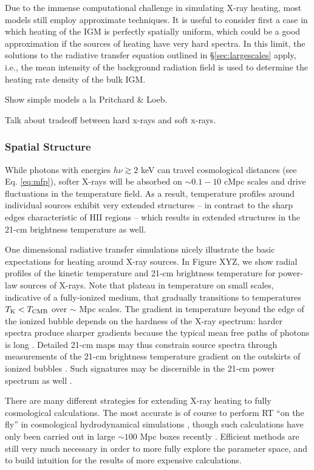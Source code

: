 Due to the immense computational challenge in simulating X-ray heating, most models still employ approximate techniques. It is useful to consider first a case in which heating of the IGM is perfectly spatially uniform, which could be a good approximation if the sources of heating have very hard spectra. In this limit, the solutions to the radiative transfer equation outlined in \S\ref{sec:largescales} apply, i.e., the mean intensity of the background radiation field is used to determine the heating rate density of the bulk IGM. 

{\color{red} Show simple models a la Pritchard \& Loeb.}

Talk about tradeoff between hard x-rays and soft x-rays.


\subsubsection{Spatial Structure} \label{sec:temperature_local}
While photons with energies $h\nu \gtrsim 2$ keV can travel cosmological distances (see Eq. \ref{eq:mfp}), softer X-rays will be absorbed on $\sim 0.1-10$ cMpc scales and drive fluctuations in the temperature field. As a result, temperature profiles around individual sources exhibit very extended structures -- in contrast to the sharp edges characteristic of HII regions -- which results in extended structures in the 21-cm brightness temperature as well. 

One dimensional radiative transfer simulations nicely illustrate the basic expectations for heating around X-ray sources. In Figure XYZ, we show radial profiles of the kinetic temperature and 21-cm brightness temperature for power-law sources of X-rays. Note that plateau in temperature on small scales, indicative of a fully-ionized medium, that gradually transitions to temperatures $T_{\text{K}} < T_{\text{CMB}}$ over $\sim$ Mpc scales. The gradient in temperature beyond the edge of the ionized bubble depends on the hardness of the X-ray spectrum: harder spectra produce sharper gradients because the typical mean free paths of photons is long \cite{Thomas2008,Knevit2014,Mirocha2012,McQuinn2012}. Detailed 21-cm maps may thus constrain source spectra through measurements of the 21-cm brightness temperature gradient on the outskirts of ionized bubbles \cite{Kramer2008}. Such signatures may be discernible in the 21-cm power spectrum as well \cite{Pacucci2014}.

There are many different strategies for extending X-ray heating to fully cosmological calculations. The most accurate is of course to perform RT ``on the fly'' in cosmological hydrodynamical simulations \cite{Xu2014}, though such calculations have only been carried out in large $\sim 100$ Mpc boxes recently \cite{Ross2017}. Efficient methods are still very much necessary in order to more fully explore the parameter space, and to build intuition for the results of more expensive calculations.

